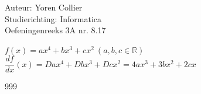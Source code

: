 \documentclass[a4paper]{article}
\newcommand{\Lh}{\left(} %
\newcommand{\Rh}{\right)}
\begin{document}
\noindent \large Auteur: Yoren Collier \\
\noindent \large Studierichting: Informatica\\
\noindent \large Oefeningenreeks 3A nr. 8.17\\

\medskip

\normalsize

$f(x) = ax^4 + bx^3 + cx^2 \: \Lh a, b, c \in \mathbb{R} \Rh$\\

$\dfrac{df}{dx}(x) = Dax^4 + Dbx^3 + Dcx^2 = 4ax^3 + 3bx^2 + 2cx$\\

\begin{thebibliography}{999}
\end{thebibliography}
\end{document}
